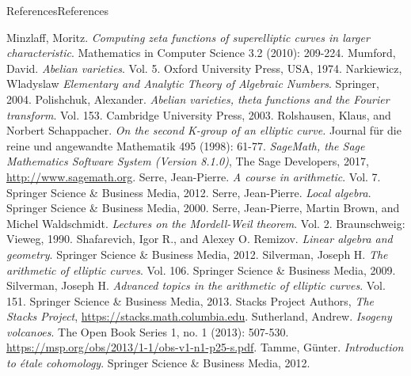 \documentclass[10pt,]{book}
\numberwithin{equation}{section}
\begin{document}
\begin{references-chapter-numberless}{References}{}{References}{}{}
\begin{thebibliography}{9}
\hypertarget{bib-minzlaff}{}Minzlaff, Moritz. \textit{Computing zeta functions of superelliptic curves in larger characteristic}. Mathematics in Computer Science 3.2 (2010): 209-224.
\hypertarget{bib-mumford-abvar}{}Mumford, David. \textit{Abelian varieties}. Vol. 5. Oxford University Press, USA, 1974.
\hypertarget{bib-narkiewicz}{}Narkiewicz, Wladyslaw  \textit{Elementary and Analytic Theory of Algebraic Numbers}. Springer, 2004.
\hypertarget{bib-polishchuck}{}Polishchuk, Alexander. \textit{Abelian varieties, theta functions and the Fourier transform}. Vol. 153. Cambridge University Press, 2003.
\hypertarget{bib-rolshausen}{}Rolshausen, Klaus, and Norbert Schappacher.  \textit{On the second K-group of an elliptic curve.}  Journal für die reine und angewandte Mathematik 495 (1998): 61-77.
\hypertarget{bib-sage}{}\textit{SageMath, the Sage Mathematics Software System (Version 8.1.0)}, The Sage Developers, 2017, \url{http://www.sagemath.org}.
\hypertarget{bib-serre-course}{}Serre, Jean-Pierre. \textit{A course in arithmetic}. Vol. 7. Springer Science \& Business Media, 2012.
\hypertarget{bib-serre-local-alg}{}Serre, Jean-Pierre. \textit{Local algebra}. Springer Science \& Business Media, 2000.
\hypertarget{bib-serre-mordell-weil}{}Serre, Jean-Pierre, Martin Brown, and Michel Waldschmidt. \textit{Lectures on the Mordell-Weil theorem}. Vol. 2. Braunschweig: Vieweg, 1990.
\hypertarget{bib-shafarevich-remizov}{}Shafarevich, Igor R., and Alexey O. Remizov. \textit{Linear algebra and geometry}. Springer Science \& Business Media, 2012.
\hypertarget{bib-silverman}{}Silverman, Joseph H. \textit{The arithmetic of elliptic curves}. Vol. 106. Springer Science \& Business Media, 2009.
\hypertarget{bib-silverman-advanced}{}Silverman, Joseph H. \textit{Advanced topics in the arithmetic of elliptic curves}. Vol. 151. Springer Science \& Business Media, 2013.
\hypertarget{bib-stacks}{}Stacks Project Authors, \textit{The Stacks Project}, \href{}{https://stacks.math.columbia.edu}.
\hypertarget{bib-sutherland}{}Sutherland, Andrew. \textit{Isogeny volcanoes}. The Open Book Series 1, no. 1 (2013): 507-530. \url{https://msp.org/obs/2013/1-1/obs-v1-n1-p25-s.pdf}.
\hypertarget{bib-tamme}{}Tamme, Günter. \textit{Introduction to étale cohomology}. Springer Science \& Business Media, 2012.

\end{thebibliography}
\end{references-chapter-numberless}
\end{document}
